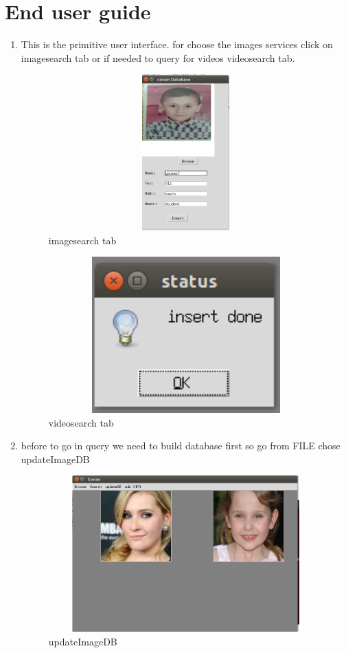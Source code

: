 \documentclass[pdftex,10pt,a4paper,oneside]{article}
\begin{document}
	\section{End user guide}
	\begin{enumerate}
		\item This is the primitive user interface.
		for choose the images services click on imagesearch tab or if needed to query for videos videosearch tab.
		
		\begin{figure}[H]
			\centering
			\includegraphics[width=120mm,height=60mm]{fig/6.png}
			\caption{imagesearch tab }
			\label{imagesearch tab}
		\end{figure}
				\begin{figure}[H]
			\centering
			\includegraphics[width=120mm,height=60mm]{fig/8.png}
			\caption{videosearch tab }
			\label{videosearch tab}
		\end{figure}
	\pagebreak
	\item before to go in query we need to build database first so go from FILE chose updateImageDB
			\begin{figure}[H]
		\centering
		\includegraphics[width=120mm,height=60mm]{fig/10.png}
		\caption{updateImageDB }
		\label{updateImageDB}
	\end{figure}
	

\end{enumerate}
\end{document}
